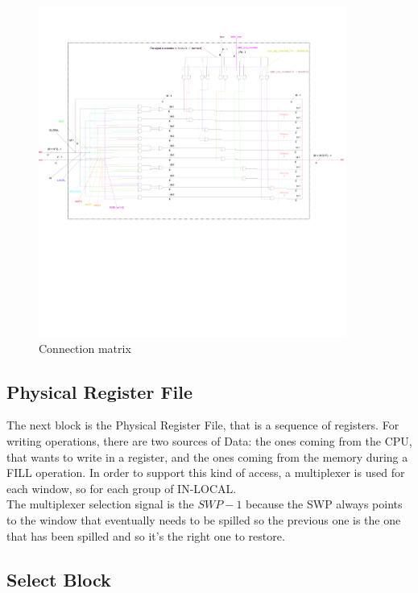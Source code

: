 \begin{figure}[H]
  \centering
  \includegraphics[width=0.9\textwidth]{chapters/4_DecodeStage/images/connection_matrix.pdf}
  \caption{Connection matrix}
  \label{connection_matrix}
\end{figure}

\newpage

\subsection{Physical Register File}

The next block is the Physical Register File, that is a sequence of registers. For writing operations, there are two sources of Data: the ones coming from the CPU, that wants to write in a register, and the ones coming from the memory during a FILL operation. In order to support this kind of access, a multiplexer is used for each window, so for each group of IN-LOCAL.\\

The multiplexer selection signal is the $SWP-1$ because the SWP always points to the window that eventually needs to be spilled so the previous one is the one that has been spilled and so it's the right one to restore.

\subsection{Select Block}

